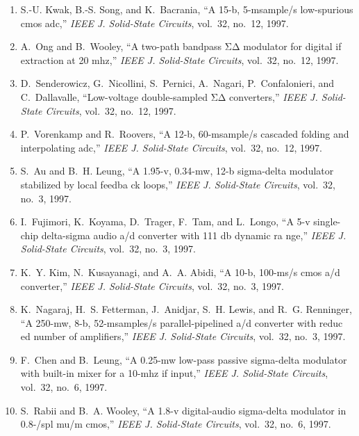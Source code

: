 \begin{enumerate}
\item
S.-U. Kwak, B.-S. Song, and K.~Bacrania, ``A 15-b, 5-msample/s low-spurious
  cmos adc,'' \emph{{IEEE} J. Solid-State Circuits}, vol.~32, no.~12, 1997.

\item
A.~Ong and B.~Wooley, ``A two-path bandpass ΣΔ modulator for digital if
  extraction at 20 mhz,'' \emph{{IEEE} J. Solid-State Circuits}, vol.~32,
  no.~12, 1997.

\item
D.~Senderowicz, G.~Nicollini, S.~Pernici, A.~Nagari, P.~Confalonieri, and
  C.~Dallavalle, ``Low-voltage double-sampled ΣΔ converters,'' \emph{{IEEE}
  J. Solid-State Circuits}, vol.~32, no.~12, 1997.

\item
P.~Vorenkamp and R.~Roovers, ``A 12-b, 60-msample/s cascaded folding and
  interpolating adc,'' \emph{{IEEE} J. Solid-State Circuits}, vol.~32, no.~12,
  1997.

\item
S.~Au and B.~H. Leung, ``A 1.95-v, 0.34-mw, 12-b sigma-delta modulator
  stabilized by local feedba ck loops,'' \emph{{IEEE} J. Solid-State Circuits},
  vol.~32, no.~3, 1997.

\item
I.~Fujimori, K.~Koyama, D.~Trager, F.~Tam, and L.~Longo, ``A 5-v single-chip
  delta-sigma audio a/d converter with 111 db dynamic ra nge,'' \emph{{IEEE} J.
  Solid-State Circuits}, vol.~32, no.~3, 1997.

\item
K.~Y. Kim, N.~Kusayanagi, and A.~A. Abidi, ``A 10-b, 100-ms/s cmos a/d
  converter,'' \emph{{IEEE} J. Solid-State Circuits}, vol.~32, no.~3, 1997.

\item
K.~Nagaraj, H.~S. Fetterman, J.~Anidjar, S.~H. Lewis, and R.~G. Renninger, ``A
  250-mw, 8-b, 52-msamples/s parallel-pipelined a/d converter with reduc ed
  number of amplifiers,'' \emph{{IEEE} J. Solid-State Circuits}, vol.~32,
  no.~3, 1997.

\item
F.~Chen and B.~Leung, ``A 0.25-mw low-pass passive sigma-delta modulator with
  built-in mixer for a 10-mhz if input,'' \emph{{IEEE} J. Solid-State
  Circuits}, vol.~32, no.~6, 1997.

\item
S.~Rabii and B.~A. Wooley, ``A 1.8-v digital-audio sigma-delta modulator in
  0.8-/spl mu/m cmos,'' \emph{{IEEE} J. Solid-State Circuits}, vol.~32, no.~6,
  1997.


\end{enumerate}
